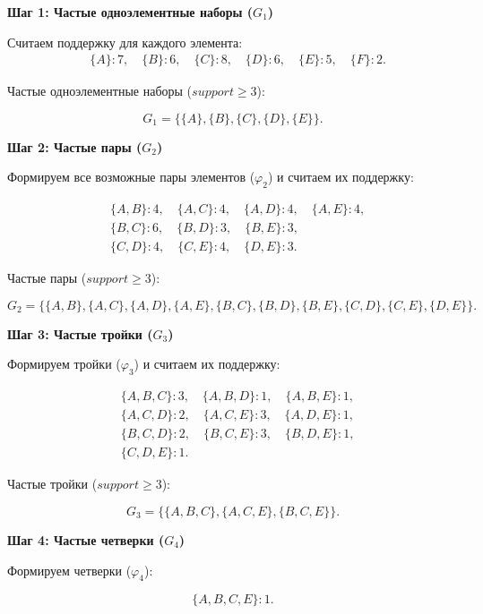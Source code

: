 \textbf{Шаг 1: Частые одноэлементные наборы (\( G_1 \))}

Считаем поддержку для каждого элемента:
\[
    \begin{aligned}
         & \{A\}: 7, \quad \{B\}: 6, \quad \{C\}: 8, \quad \{D\}: 6, \quad \{E\}: 5, \quad \{F\}: 2.
    \end{aligned}
\]

Частые одноэлементные наборы (\( support \geq 3 \)):

\[
    G_1 = \{\{A\}, \{B\}, \{C\}, \{D\}, \{E\}\}.
\]

\textbf{Шаг 2: Частые пары (\( G_2 \))}

Формируем все возможные пары элементов (\( \varphi_2 \)) и считаем их поддержку:

\[
    \begin{aligned}
         & \{A, B\}: 4, \quad \{A, C\}: 4, \quad \{A, D\}: 4, \quad \{A, E\}: 4, \\
         & \{B, C\}: 6, \quad \{B, D\}: 3, \quad \{B, E\}: 3,                    \\
         & \{C, D\}: 4, \quad \{C, E\}: 4, \quad \{D, E\}: 3.
    \end{aligned}
\]

Частые пары (\( support \geq 3 \)):

\[
    G_2 = \{\{A, B\}, \{A, C\}, \{A, D\}, \{A, E\}, \{B, C\}, \{B, D\}, \{B, E\}, \{C, D\}, \{C, E\}, \{D, E\}\}.
\]

\textbf{Шаг 3: Частые тройки (\( G_3 \))}

Формируем тройки (\( \varphi_3 \)) и считаем их поддержку:

\[
    \begin{aligned}
         & \{A, B, C\}: 3, \quad \{A, B, D\}: 1, \quad \{A, B, E\}: 1, \\
         & \{A, C, D\}: 2, \quad \{A, C, E\}: 3, \quad \{A, D, E\}: 1, \\
         & \{B, C, D\}: 2, \quad \{B, C, E\}: 3, \quad \{B, D, E\}: 1, \\
         & \{C, D, E\}: 1.
    \end{aligned}
\]

Частые тройки (\( support \geq 3 \)):

\[
    G_3 = \{\{A, B, C\}, \{A, C, E\}, \{B, C, E\}\}.
\]

\textbf{Шаг 4: Частые четверки (\( G_4 \))}

Формируем четверки (\( \varphi_4 \)):

\[
    \{A, B, C, E\}: 1.
\]

